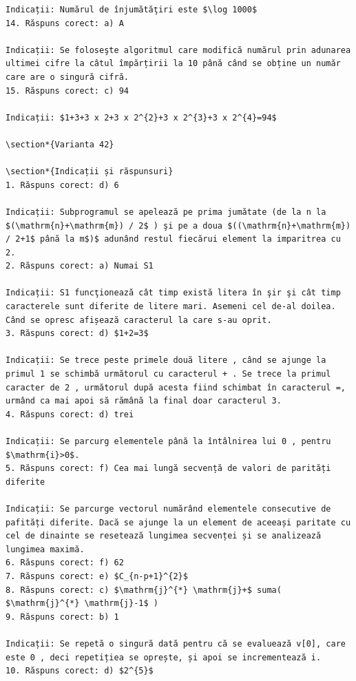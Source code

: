\documentclass[10pt]{article}
\begin{document}
\begin{verbatim}
Indicații: Numărul de înjumătăţiri este $\log 1000$
14. Răspuns corect: a) A

Indicații: Se foloseşte algoritmul care modifică numărul prin adunarea ultimei cifre la câtul împărțirii la 10 până când se obține un număr care are o singură cifră.
15. Răspuns corect: c) 94

Indicații: $1+3+3 x 2+3 x 2^{2}+3 x 2^{3}+3 x 2^{4}=94$

\section*{Varianta 42}

\section*{Indicații și răspunsuri}
1. Răspuns corect: d) 6

Indicații: Subprogramul se apelează pe prima jumătate (de la n la $(\mathrm{n}+\mathrm{m}) / 2$ ) şi pe a doua $((\mathrm{n}+\mathrm{m}) / 2+1$ până la m$)$ adunând restul fiecărui element la imparitrea cu 2.
2. Răspuns corect: a) Numai S1

Indicații: S1 funcţionează cât timp există litera în şir şi cât timp caracterele sunt diferite de litere mari. Asemeni cel de-al doilea. Când se opresc afișează caracterul la care s-au oprit.
3. Răspuns corect: d) $1+2=3$

Indicații: Se trece peste primele două litere , când se ajunge la primul 1 se schimbă următorul cu caracterul + . Se trece la primul caracter de 2 , următorul după acesta fiind schimbat în caracterul =, urmând ca mai apoi să rămână la final doar caracterul 3.
4. Răspuns corect: d) trei

Indicații: Se parcurg elementele până la întâlnirea lui 0 , pentru $\mathrm{i}>0$.
5. Răspuns corect: f) Cea mai lungă secvență de valori de parități diferite

Indicații: Se parcurge vectorul numărând elementele consecutive de pafități diferite. Dacă se ajunge la un element de aceeași paritate cu cel de dinainte se resetează lungimea secvenței și se analizează lungimea maximă.
6. Răspuns corect: f) 62
7. Răspuns corect: e) $C_{n-p+1}^{2}$
8. Răspuns corect: c) $\mathrm{j}^{*} \mathrm{j}+$ suma( $\mathrm{j}^{*} \mathrm{j}-1$ )
9. Răspuns corect: b) 1

Indicații: Se repetă o singură dată pentru că se evaluează v[0], care este 0 , deci repetițiea se oprește, și apoi se incrementează i.
10. Răspuns corect: d) $2^{5}$


\end{verbatim}
\end{document}
